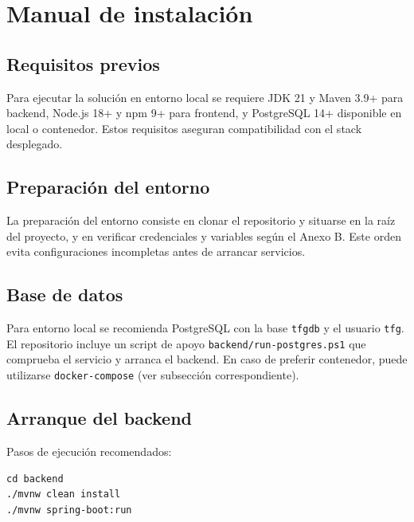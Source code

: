 \chapter{Manual de instalaci\'on}\label{apendice-instalacion}
\makeatletter
{}
\makeatother

\section{Requisitos previos}

Para ejecutar la soluci\'on en entorno local se requiere JDK 21 y Maven 3.9+ para backend, Node.js 18+ y npm 9+ para frontend, y PostgreSQL 14+ disponible en local o contenedor. Estos requisitos aseguran compatibilidad con el stack desplegado.

\section{Preparaci\'on del entorno}

La preparaci\'on del entorno consiste en clonar el repositorio y situarse en la ra\'iz del proyecto, y en verificar credenciales y variables seg\'un el Anexo B. Este orden evita configuraciones incompletas antes de arrancar servicios.

\section{Base de datos}

Para entorno local se recomienda PostgreSQL con la base \texttt{tfgdb}
y el usuario \texttt{tfg}. El repositorio incluye un script de apoyo
\texttt{backend/run-postgres.ps1} que comprueba el servicio y arranca
el backend. En caso de preferir contenedor, puede utilizarse
\texttt{docker-compose} (ver subsecci\'on correspondiente).

\section{Arranque del backend}

Pasos de ejecuci\'on recomendados:

\begin{verbatim}
cd backend
./mvnw clean install
./mvnw spring-boot:run
\end{verbatim}

